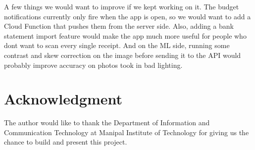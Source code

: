 \documentclass[conference]{IEEEtran}
\begin{document}
A few things we would want to improve if we kept working on it. The budget notifications currently only fire when the app is open, so we would want to add a Cloud Function that pushes them from the server side. Also, adding a bank statement import feature would make the app much more useful for people who dont want to scan every single receipt. And on the ML side, running some contrast and skew correction on the image before sending it to the API would probably improve accuracy on photos took in bad lighting.

\section*{Acknowledgment}

The author would like to thank the Department of Information and Communication Technology at Manipal Institute of Technology for giving us the chance to build and present this project.
\end{document}
